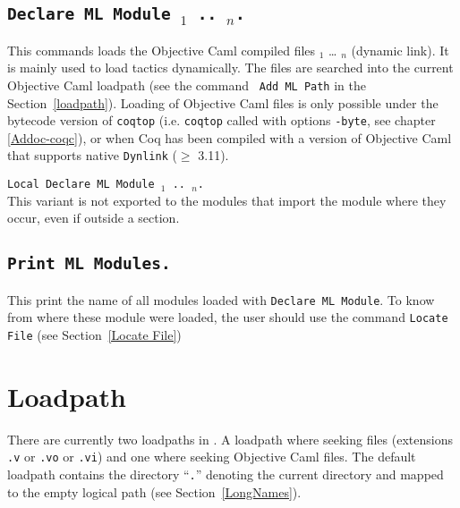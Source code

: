 \subsection[\tt Declare ML Module {\str$_1$} .. {\str$_n$}.]{\tt Declare ML Module {\str$_1$} .. {\str$_n$}.}
This commands loads the Objective Caml compiled files {\str$_1$} \dots
{\str$_n$} (dynamic link). It is mainly used to load tactics
dynamically.
 The files are
searched into the current Objective Caml loadpath (see the command {\tt
Add ML Path} in the Section~\ref{loadpath}).  Loading of Objective Caml
files is only possible under the bytecode version of {\tt coqtop}
(i.e. {\tt coqtop} called with options {\tt -byte}, see chapter 
\ref{Addoc-coqc}), or when Coq has been compiled with a version of
Objective Caml that supports native {\tt Dynlink} ($\ge$ 3.11).

\begin{Variants}
\item {\tt Local Declare ML Module {\str$_1$} .. {\str$_n$}.}\\
  This variant is not exported to the modules that import the module
  where they occur, even if outside a section.
\end{Variants}

\begin{ErrMsgs}
\item {}
\item {}
\end{ErrMsgs}

\subsection[\tt Print ML Modules.]{\tt Print ML Modules.}
This print the name of all \ocaml{} modules loaded with \texttt{Declare
  ML Module}. To know from where these module were loaded, the user
should use the command \texttt{Locate File} (see Section~\ref{Locate File})

\section[Loadpath]{Loadpath\label{loadpath}}

There are currently two loadpaths in \Coq. A loadpath where seeking
{\Coq} files (extensions {\tt .v} or {\tt .vo} or {\tt .vi}) and one where
seeking Objective Caml files. The default loadpath contains the
directory ``\texttt{.}'' denoting the current directory and mapped to the empty logical path (see Section~\ref{LongNames}).

